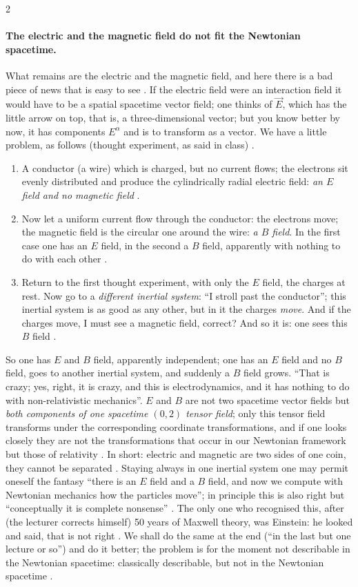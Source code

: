 \begin{paracol}{2}
\paragraph{The electric and the magnetic field do not fit the Newtonian spacetime.} What remains are the electric and the magnetic field, and here there is a bad piece of news that is easy to see . If the electric field were an interaction field it would have to be a spatial spacetime
vector field; one thinks of $\vec E$, which has the little arrow on top, that is, a three-dimensional vector; but you know better by now, it has components $E^\alpha$ and is to transform as a vector. We have a little problem, as follows
(thought experiment, as said in class) .
\begin{enumerate}
  \item A conductor (a wire) which is charged, but no current flows; the electrons sit evenly distributed and produce the cylindrically radial electric field: \emph{an $E$ field and no magnetic field} .
  \item Now let a uniform current flow through the conductor: the electrons move; the magnetic field is the circular one around the wire: \emph{a $B$ field}. In the first case one has an $E$ field, in the second a $B$ field, apparently with nothing to do with each other .
  \item Return to the first thought experiment, with only the $E$ field, the charges at rest. Now go to a \emph{different inertial system}: ``I stroll past the conductor''; this inertial system is as good as any other, but in it the charges \emph{move}. And if the charges move, I must see a magnetic field,
        correct? And so it is: one sees this $B$ field .
\end{enumerate}
So one has $E$ and $B$ field, apparently independent; one has an $E$ field and no $B$ field, goes to another inertial system, and suddenly a $B$ field grows. ``That is crazy; yes, right, it is crazy, and this is electrodynamics, and it has nothing to do with non-relativistic mechanics''. $E$ and $B$ are not two
spacetime vector fields but \emph{both components of one spacetime $(0,2)$ tensor field}; only this tensor field transforms under the corresponding coordinate transformations, and if one looks closely they are not the transformations that occur in our Newtonian framework but those of relativity
. In short: electric and magnetic are two sides of one coin, they cannot be separated . Staying always in one inertial system one may permit oneself the fantasy ``there is an $E$ field and a $B$ field, and now we compute with Newtonian mechanics how the particles move''; in principle this is
also right but ``conceptually it is complete nonsense'' . The only one who recognised this, after (the lecturer corrects himself) 50 years of Maxwell theory, was Einstein: he looked and said, that is not right . We shall do the same at the end (``in the last but one lecture or so'') and do it better;
the problem is for the moment not describable in the Newtonian spacetime: classically describable, but not in the Newtonian spacetime .


\end{paracol}

